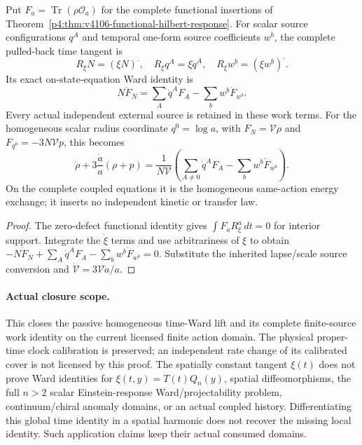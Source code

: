 \documentclass[12pt,a4paper]{article}
\begin{document}
\begin{corollary}
\label{p4:cor:v4118-homogeneous-source-work}
Put $F_a=\operatorname{Tr}(\rho\mathcal O_a)$ for the complete functional
insertions of Theorem~\ref{p4:thm:v4106-functional-hilbert-response}.
For scalar source configurations $q^A$ and temporal one-form source
coefficients $w^b$, the complete pulled-back time tangent is
\[
 R_\xi N=(\xi N)^{\boldsymbol\cdot},\quad
 R_\xi q^A=\xi\dot q^A,\quad
 R_\xi w^b=(\xi w^b)^{\boldsymbol\cdot}.
\]
Its exact on-state-equation Ward identity is
\[
 \boxed{N\dot F_N=\sum_A\dot q^AF_A-\sum_b w^b\dot F_{w^b}.}
\]
Every actual independent external source is retained in these work terms.
For the homogeneous scalar radius coordinate $q^0=\log a$, with
$F_N=\mathcal V\rho$ and $F_{q^0}=-3N\mathcal V p$, this becomes
\[
 \dot\rho+3\frac{\dot a}{a}(\rho+p)
 =\frac1{N\mathcal V}
   \left(\sum_{A\ne0}\dot q^AF_A
                 -\sum_b w^b\dot F_{w^b}\right).
\]
On the complete coupled equations it is the homogeneous same-action
energy exchange; it inserts no independent kinetic or transfer law.
\end{corollary}
\begin{proof}
The zero-defect functional identity gives
$\int F_aR_\xi^a\,dt=0$ for interior support. Integrate the
$\dot\xi$ terms and use arbitrariness of $\xi$ to obtain
$-N\dot F_N+\sum_A\dot q^AF_A-\sum_b w^b\dot F_{w^b}=0$.
Substitute the inherited lapse/scale source conversion and
$\dot{\mathcal V}=3\mathcal V\dot a/a$.
\end{proof}

\paragraph{Actual closure scope.}
This closes the passive homogeneous time-Ward lift and its complete
finite-source work identity on the current licensed finite action domain.
The physical proper-time clock calibration is preserved; an independent
rate change of its calibrated cover is not licensed by this proof.
The spatially constant tangent $\xi(t)$ does not prove Ward identities for
$\xi(t,y)=T(t)Q_n(y)$, spatial diffeomorphisms, the full $n>2$ scalar
Einstein-response Ward/projectability problem, continuum/chiral anomaly
domains, or an actual coupled history. Differentiating this global time
identity in a spatial harmonic does not recover the missing local
identity. Such application claims keep their actual consumed domains.

\end{document}
